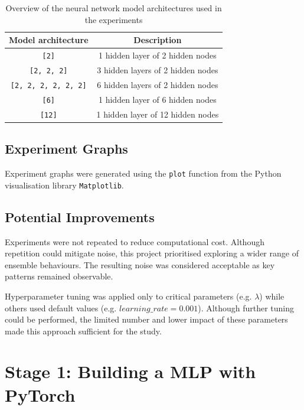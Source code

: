 \documentclass{article}
\begin{document}
\begin{table}[H]
    \centering
    \begin{tabular}{|c|c|}
        \hline
        Model architecture & Description \\
        \hline
        \small\texttt{[2]} & 1 hidden layer of 2 hidden nodes \\
        \hline
        \small\texttt{[2, 2, 2]} & 3 hidden layers of 2 hidden nodes \\
        \hline
        \small\texttt{[2, 2, 2, 2, 2, 2]} & 6 hidden layers of 2 hidden nodes \\
        \hline
        \small\texttt{[6]} & 1 hidden layer of 6 hidden nodes \\
        \hline
        \small\texttt{[12]} & 1 hidden layer of 12 hidden nodes \\
        \hline
    \end{tabular}
    \caption{Overview of the neural network model architectures used in the experiments}
    \label{table:background_model_architecture}
\end{table}


\subsection{Experiment Graphs}
Experiment graphs were generated using the \texttt{plot} function from the Python visualisation library \texttt{Matplotlib}. 


\subsection{Potential Improvements}
Experiments were not repeated to reduce computational cost. Although repetition could mitigate noise, this project prioritised exploring a wider range of ensemble behaviours. The resulting noise was considered acceptable as key patterns remained observable. 

Hyperparameter tuning was applied only to critical parameters (e.g. $\lambda$) while others used default values (e.g. $learning\_rate = 0.001$). Although further tuning could be performed, the limited number and lower impact of these parameters made this approach sufficient for the study. 


\section{Stage 1: Building a MLP with PyTorch}
\label{sec:stage_1}
\end{document}
